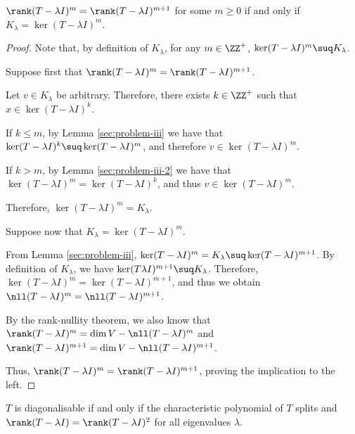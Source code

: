 \documentclass[11pt]{scrartcl}
\begin{document}
\begin{lemma}
  \label{sec:problem-iii-5}
  $\rank (T-\lambda I)^m = \rank (T-\lambda I)^{m+1}$ for some $m \geq 0$ if and only if $K_{\lambda}= \ker (T-\lambda I)^m$.
\end{lemma}

\begin{proof}
  \hfill

  Note that, by definition of $K_{\lambda}$, for any $m \in \ZZ^+$,
  $\ker (T-\lambda I)^m \suq K_{\lambda}$.

  Suppose first that
  $\rank (T-\lambda I)^m = \rank (T-\lambda I)^{m+1}$.

  Let $v\in K_{\lambda}$ be arbitrary. Therefore, there exists
  $k\in \ZZ^+$ such that $x\in \ker(T-\lambda I)^k $.

  If $k \leq m$, by Lemma \ref{sec:problem-iii} we have that
  $\ker (T-\lambda I)^k\suq \ker (T-\lambda I)^m$, and therefore
  $v\in \ker (T-\lambda I)^m$.

  If $k > m$, by Lemma \ref{sec:problem-iii-2} we have that $\ker (T-\lambda I)^m = \ker (T-\lambda I)^k$, and thus $v\in \ker (T-\lambda I)^m$.

  Therefore, $\ker (T-\lambda I)^m = K_{\lambda}$.

  Suppose now that $K_{\lambda} = \ker(T-\lambda I)^m$.

  From Lemma \ref{sec:problem-iii},
  $\ker (T-\lambda I)^m = K_{\lambda}\suq \ker(T-\lambda I)^{m+1}$. By
  definition of $K_{\lambda}$, we have
  $\ker(T\lambda I)^{m+1}\suq K_{\lambda}$. Therefore,
  $\ker (T-\lambda I)^m = \ker (T-\lambda I)^{m+1}$, and thus we
  obtain $\nll (T-\lambda I)^m = \nll (T-\lambda I)^{m+1}$.

  By the rank-nullity theorem, we also know that
  $\rank (T-\lambda I)^m = \dim V - \nll (T-\lambda I)^m$ and
  $\rank (T-\lambda I)^{m+1} = \dim V - \nll (T-\lambda
  I)^{m+1}$.

  Thus, $\rank (T-\lambda I)^m = \rank (T-\lambda I)^{m+1}$, proving
  the implication to the left.
\end{proof}

\begin{lemma}
  $T$ is diagonalisable if and only if the characteristic polynomial
  of $T$ splits and $\rank (T-\lambda I) = \rank (T-\lambda I)^2$ for
  all eigenvalues $\lambda$.
\end{lemma}
\end{document}
